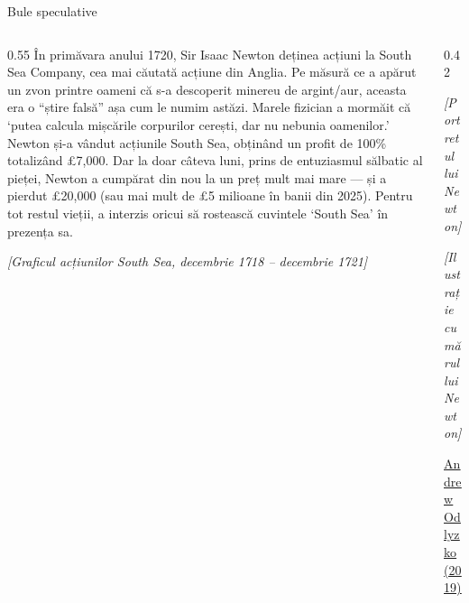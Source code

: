 \documentclass[9pt, aspectratio=169, t]{beamer}
\theoremstyle{definition}
\begin{document}
\begin{frame}{Bule speculative}
\begin{columns}[T]
\begin{column}{0.55\textwidth}
{\small
În primăvara anului 1720, Sir Isaac Newton deținea acțiuni la South Sea Company, cea mai căutată acțiune din Anglia. Pe măsură ce a apărut un zvon printre oameni că s-a descoperit minereu de argint/aur, aceasta era o ``știre falsă'' așa cum le numim astăzi. Marele fizician a mormăit că `\textcolor{IDAred}{putea calcula mișcările corpurilor cerești, dar nu nebunia oamenilor}.' Newton și-a vândut acțiunile South Sea, obținând un profit de 100\% totalizând \pounds 7,000. Dar la doar câteva luni, prins de entuziasmul sălbatic al pieței, Newton a cumpărat din nou la un preț mult mai mare --- și a pierdut \pounds 20,000 (sau mai mult de \pounds 5 milioane în banii din 2025). Pentru tot restul vieții, a interzis oricui să rostească cuvintele `South Sea' în prezența sa.
}

\vspace{0.2cm}

{\small\textit{[Graficul acțiunilor South Sea, decembrie 1718 -- decembrie 1721]}}
\end{column}
\begin{column}{0.42\textwidth}
\begin{center}
    {\small\textit{[Portretul lui Newton]}}

    \vspace{0.3cm}

    {\small\textit{[Ilustrație cu mărul lui Newton]}}

    \vspace{0.2cm}

    {\small \href{https://www.ams.org/journals/notices/201906/rnoti-p952.pdf}{\underline{Andrew Odlyzko (2019)}}}
\end{center}
\end{column}
\end{columns}
\end{frame}
\end{document}
